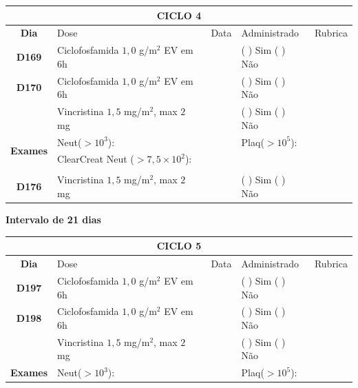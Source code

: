 \documentclass[11pt,a4paper,oldfontcommands]{memoir}
\begin{document}
\begin{center}
\begin{table}[H]
\begin{tabular}{p{1cm}p{6cm}|p{1cm}|p{3cm}|p{2.5cm}}
    \hline
	\multicolumn{5}{c}{\textbf{CICLO 4}}\\
	\hline
    \multicolumn{1}{c|}{\multirow{1}{*}{\textbf{Dia}}}&{Dose}&{Data}&{Administrado}&{Rubrica} \\
    \hline
    \multicolumn{1}{c|}{\multirow{1}{*}{\textbf{D169}}}&{Ciclofosfamida \(1,0\) g/m\(^2\) EV em 6h}&&{(  ) Sim (  ) Não}&\\
    \multicolumn{1}{c|}{\multirow{1}{*}{\textbf{D170}}}&{Ciclofosfamida \(1,0\) g/m\(^2\) EV em 6h}&&{(  ) Sim (  ) Não}&\\
    \multicolumn{1}{c|}{\multirow{1}{*}{\textbf{}}}&{Vincristina \(1,5\) mg/m\(^2\), max \(2\) mg}&&{(  ) Sim (  ) Não}&\\
    \hline
    \multicolumn{1}{c|}{\multirow{2}{*}{\textbf{Exames}}}&\multicolumn{2}{l|}{Neut(\(>10^3\)):}&{Plaq(\(>10^5\)):}&\\
    \cline{2-5}
    \multicolumn{1}{c|}{\multirow{2}{*}{{}}}&\multicolumn{2}{l|}{ClearCreat Neut (\(>7,5\times10^2\)):}&{}&{}\\
    \hline\\
    \hline
    \multicolumn{1}{c|}{\multirow{1}{*}{\textbf{D176}}}&{Vincristina \(1,5\) mg/m\(^2\), max \(2\) mg}&&{(  ) Sim (  ) Não}&\\
    \hline
\end{tabular}
\end{table}
\textbf{Intervalo de 21 dias}
\begin{table}[H]
\begin{tabular}{p{1cm}p{6cm}|p{1cm}|p{3cm}|p{2.5cm}}
    \hline
	\multicolumn{5}{c}{\textbf{CICLO 5}}\\
	\hline
    \multicolumn{1}{c|}{\multirow{1}{*}{\textbf{Dia}}}&{Dose}&{Data}&{Administrado}&{Rubrica} \\
    \hline
    \multicolumn{1}{c|}{\multirow{1}{*}{\textbf{D197}}}&{Ciclofosfamida \(1,0\) g/m\(^2\) EV em 6h}&&{(  ) Sim (  ) Não}&\\
    \multicolumn{1}{c|}{\multirow{1}{*}{\textbf{D198}}}&{Ciclofosfamida \(1,0\) g/m\(^2\) EV em 6h}&&{(  ) Sim (  ) Não}&\\
    \multicolumn{1}{c|}{\multirow{1}{*}{\textbf{}}}&{Vincristina \(1,5\) mg/m\(^2\), max \(2\) mg}&&{(  ) Sim (  ) Não}&\\
    \hline
    \multicolumn{1}{c|}{\multirow{2}{*}{\textbf{Exames}}}&\multicolumn{2}{l|}{Neut(\(>10^3\)):}&{Plaq(\(>10^5\)):}&\\

\end{tabular}
\end{table}
\end{center}
\end{document}
